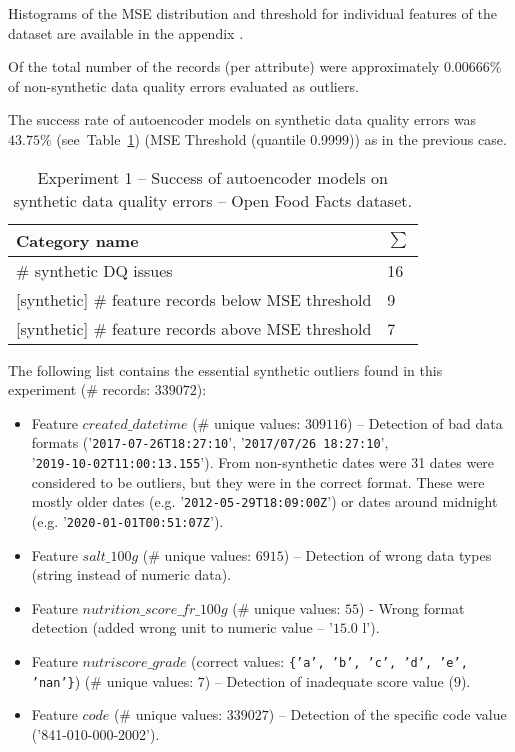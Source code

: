 					Histograms of the MSE distribution and threshold for individual features of the dataset are available in the appendix .
					
					Of the total number of the records (per attribute) were approximately $0.00666\%$ of non-synthetic data quality errors evaluated as outliers.

					The success rate of autoencoder models on synthetic data quality errors was $43.75\%$ (see~Table~\ref{tab:exp1-autoencoder-foods-synthetic-success}) (MSE Threshold (quantile 0.9999)) as in the previous case.
					
					\begin{table}[!h]
\caption{Experiment 1 -- Success of autoencoder models on synthetic data quality errors -- Open Food Facts dataset.}\label{tab:exp1-autoencoder-foods-synthetic-success}
\begin{tabular}{|l|l|}
\hline
\textbf{Category name}                                     & \textbf{$\sum$} \\ \hline
\# synthetic DQ issues                            & 16           \\ \hline
{[}synthetic{]} \# feature records below MSE threshold     & 9            \\ \hline
{[}synthetic{]} \# feature records above MSE threshold     & 7            \\ \hline
\end{tabular}
\end{table}

					The following list contains the essential synthetic outliers found in this experiment (\# records: $339072$):
					
					\begin{itemize}
						\item Feature $created\_datetime$ (\# unique values: $309116$) -- Detection of bad data formats ('\texttt{2017-07-26T18:27:10}', '\texttt{2017/07/26 18:27:10}',\\ '\texttt{2019-10-02T11:00:13.155}'). From non-synthetic dates were  31 dates were considered to be outliers, but they were in the correct format. These were mostly older dates (e.g. '\texttt{2012-05-29T18:09:00Z}') or dates around midnight (e.g. '\texttt{2020-01-01T00:51:07Z}'). 
						\item Feature $salt\_100g$ (\# unique values: $6915$) -- Detection of wrong data types (string instead of numeric data).
						\item Feature $nutrition\_score\_fr\_100g$ (\# unique values: $55$) - Wrong format detection (added wrong unit to numeric value -- '$15.0$ l').
						\item Feature $nutriscore\_grade$ (correct values: \texttt{\{'a', 'b', 'c', 'd', 'e', 'nan'\}}) (\# unique values: $7$) -- Detection of inadequate score value ($9$).
						\item Feature $code$ (\# unique values: $339027$) -- Detection of the specific code value ('841-010-000-2002').
					\end{itemize}
					
